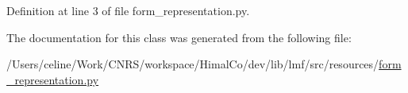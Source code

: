 Definition at line 3 of file form\+\_\+representation.\+py.



The documentation for this class was generated from the following file\+:\begin{DoxyCompactItemize}
\item 
/\+Users/celine/\+Work/\+C\+N\+R\+S/workspace/\+Himal\+Co/dev/lib/lmf/src/resources/\hyperlink{resources_2form__representation_8py}{form\+\_\+representation.\+py}\end{DoxyCompactItemize}
